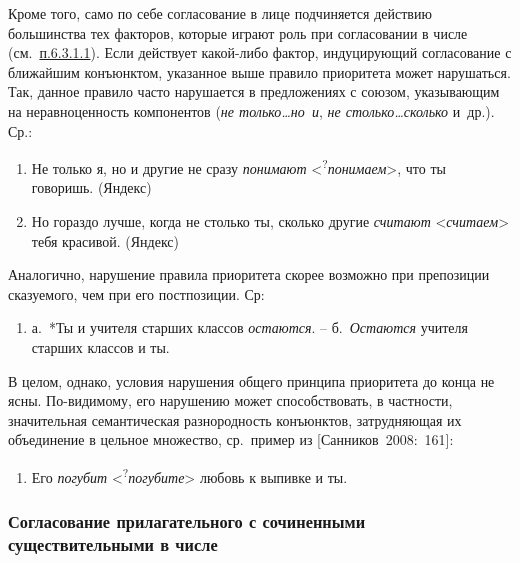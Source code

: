 Кроме того, само по себе согласование в лице подчиняется действию
большинства тех факторов, которые играют роль при согласовании в числе
(см.~\underline{п.6.3.1.1}). Если действует какой-либо фактор,
индуцирующий согласование с ближайшим конъюнктом, указанное выше правило
приоритета может нарушаться. Так, данное правило часто нарушается в
предложениях с союзом, указывающим на неравноценность компонентов
(\textit{не только\ldots но~и}, \textit{не столько\ldots сколько} и~др.).
Ср.:

\begin{enumerate}
\def\labelenumi{(\arabic{enumi})}
\setcounter{enumi}{123}
\item
  Не только я, но и другие не сразу \textit{понимают}
  \textless{}\textsuperscript{?}\textit{понимаем}\textgreater, что ты
  говоришь. (Яндекс)
\item
  Но гораздо лучше, когда не столько ты, сколько другие \textit{считают}
  \textless*\textit{считаем}\textgreater{} тебя красивой. (Яндекс)
\end{enumerate}

Аналогично, нарушение правила приоритета скорее возможно при препозиции
сказуемого, чем при его постпозиции. Ср:

\begin{enumerate}
\def\labelenumi{(\arabic{enumi})}
\setcounter{enumi}{125}
\item
  а.~*Ты и учителя старших классов \textit{остаются}. --
  б.~\textit{Остаются} учителя старших классов и ты.
\end{enumerate}

В целом, однако, условия нарушения общего принципа приоритета до конца
не ясны. По-видимому, его нарушению может способствовать, в частности,
значительная семантическая разнородность конъюнктов, затрудняющая их
объединение в цельное множество, ср.~пример из {[}Санников~2008:~161{]}:

\begin{enumerate}
\def\labelenumi{(\arabic{enumi})}
\setcounter{enumi}{126}
\item
  Его \textit{погубит}
  \textless*\textsuperscript{?}\textit{погубите}\textgreater{} любовь к
  выпивке и ты.
\end{enumerate}

\subsubsection{Согласование прилагательного с сочиненными
существительными в
числе}\label{ux441ux43eux433ux43bux430ux441ux43eux432ux430ux43dux438ux435-ux43fux440ux438ux43bux430ux433ux430ux442ux435ux43bux44cux43dux43eux433ux43e-ux441-ux441ux43eux447ux438ux43dux435ux43dux43dux44bux43cux438-ux441ux443ux449ux435ux441ux442ux432ux438ux442ux435ux43bux44cux43dux44bux43cux438-ux432-ux447ux438ux441ux43bux435}

